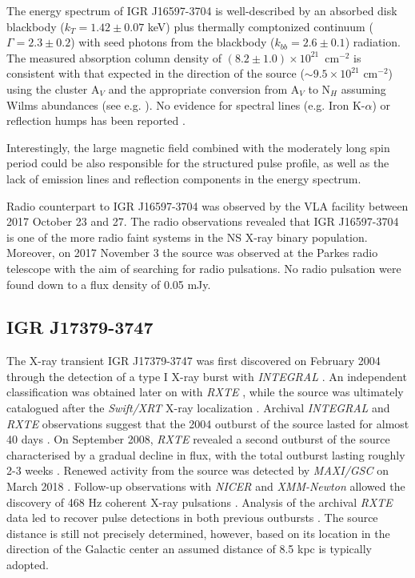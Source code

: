 \documentclass[graybox]{svmult}
\def \inte {{\em INTEGRAL\xspace}}
\def \xmm {{\em XMM-Newton\xspace}}
\def \rxte {{\em RXTE\xspace}}
\def \swiftxrt{{\em Swift/XRT\xspace}}
\def \nicer{{\em NICER\xspace}}
\def \maxigsc{{\em MAXI/GSC\xspace}}
\begin{document}
The energy spectrum of IGR J16597-3704 is  well-described by an absorbed disk blackbody ($k_T=1.42\pm0.07$ keV) plus thermally comptonized continuum ($\Gamma=2.3\pm0.2$) with seed 
photons from the blackbody ($k_{bb}=2.6\pm0.1$) radiation. The measured absorption column density 
of $(8.2\pm1.0)\times10^{21}$~cm$^{-2}$ is consistent with that expected in the direction of the source ($\sim 9.5\times10^{21}$ cm$^{-2}$) using the cluster A$_V$ \cite{Harris1996} and the appropriate conversion from A$_V$ to N$_H$ assuming Wilms abundances (see e.g. \cite{Bahramian2015,Foight2016}). No evidence for spectral lines (e.g. Iron K-$\alpha$) or reflection humps has been reported \cite{Sanna2018b}.

Interestingly, the large magnetic field combined with the moderately long spin period could be also responsible for the structured pulse profile, as well as the lack of emission lines and reflection components in the energy spectrum.

Radio counterpart to IGR J16597-3704 was observed by the VLA facility between 2017 October 23 and 27. The radio observations revealed that IGR J16597-3704 is one of the more radio faint systems in the NS X-ray binary population. Moreover, on 2017 November 3 the source was observed at the Parkes radio telescope with the aim of searching for radio pulsations. No radio pulsation were found down to a flux density of 0.05 mJy.

\subsection{IGR J17379-3747}

The X-ray transient IGR J17379-3747 was first discovered on February 2004 through the detection of a type I X-ray burst with \inte{} \cite{Chelovekov2006}. An independent classification was obtained later on with \rxte{} \cite{Markwardt2008}, while the source was ultimately catalogued after the \swiftxrt{} X-ray localization \cite{Bird2007,Krivonos2007,Krimm2008}. Archival \inte{} and \rxte{} observations suggest that the 2004 outburst of the source lasted for almost 40 days \cite{Markwardt2008,Chelovekov2010}. On September 2008, \rxte{} revealed a second outburst of the source characterised by a gradual decline in flux, with the total outburst lasting roughly 2-3 weeks \cite{Markwardt2008,Shaw2008}.
Renewed activity from the source was detected by \maxigsc{} on March 2018 \cite{Negoro2018}. Follow-up observations with \nicer{} and \xmm{} allowed the discovery of 468 Hz coherent X-ray pulsations \cite{Strohmayer2018b,Sanna2018b}. Analysis of the archival \rxte{} data led to recover pulse detections in both previous outbursts \cite{Sanna2018b}.
The source distance is still not precisely determined, however, based on its location in the direction of the Galactic center an assumed distance of 8.5 kpc is typically adopted. 
\end{document}
